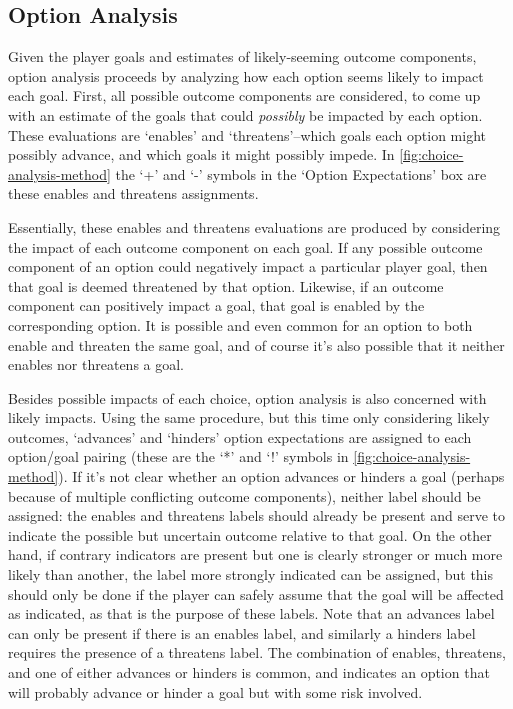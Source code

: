 \subsection{Option Analysis}

Given the player goals and estimates of likely-seeming outcome components, option analysis proceeds by analyzing how each option seems likely to impact each goal.
%
First, all possible outcome components are considered, to come up with an estimate of the goals that could \emph{possibly} be impacted by each option.
%
These evaluations are `enables' and `threatens'--which goals each option might possibly advance, and which goals it might possibly impede.
%
In \cref{fig:choice-analysis-method} the `+' and `-' symbols in the `Option Expectations' box are these enables and threatens assignments.


Essentially, these enables and threatens evaluations are produced by considering the impact of each outcome component on each goal.
%
If any possible outcome component of an option could negatively impact a particular player goal, then that goal is deemed threatened by that option.
%
Likewise, if an outcome component can positively impact a goal, that goal is enabled by the corresponding option.
%
It is possible and even common for an option to both enable and threaten the same goal, and of course it's also possible that it neither enables nor threatens a goal.


Besides possible impacts of each choice, option analysis is also concerned with likely impacts.
%
Using the same procedure, but this time only considering likely outcomes, `advances' and `hinders' option expectations are assigned to each option/goal pairing (these are the `*' and `!' symbols in \cref{fig:choice-analysis-method}).
%
If it's not clear whether an option advances or hinders a goal (perhaps because of multiple conflicting outcome components), neither label should be assigned: the enables and threatens labels should already be present and serve to indicate the possible but uncertain outcome relative to that goal.
%
On the other hand, if contrary indicators are present but one is clearly stronger or much more likely than another, the label more strongly indicated can be assigned, but this should only be done if the player can safely assume that the goal will be affected as indicated, as that is the purpose of these labels.
%
Note that an advances label can only be present if there is an enables label, and similarly a hinders label requires the presence of a threatens label.
%
The combination of enables, threatens, and one of either advances or hinders is common, and indicates an option that will probably advance or hinder a goal but with some risk involved.


